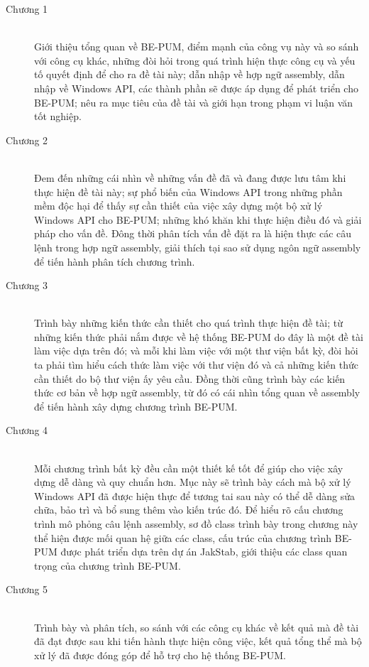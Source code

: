 \begin{description}
  	\item[Chương 1] \hfill \\
	Giới thiệu tổng quan về BE-PUM, điểm mạnh của công vụ này và so sánh với công cụ khác, những đòi hỏi trong quá trình hiện thực công cụ và yếu tố quyết  định để cho ra đề tài này; dẫn nhập về hợp ngữ assembly, dẫn nhập về Windows API, các thành phần sẽ được áp dụng để phát triển cho BE-PUM; nêu ra mục tiêu của đề tài và giới hạn trong phạm vi luận văn tốt nghiệp. \\
 	\item[Chương 2] \hfill \\
	Đem đến những cái nhìn về những vấn đề đã và đang được lưu tâm khi thực hiện đề tài này; sự phổ biến của Windows API trong những phần mềm độc hại để thấy sự cần thiết của việc xây dựng một bộ xử lý Windows API cho BE-PUM; những khó khăn khi thực hiện điều đó và giải pháp cho vấn đề. Đông thời phân tích vấn đề đặt ra là hiện thực các câu lệnh trong hợp ngữ assembly, giải thích tại sao sử dụng ngôn ngữ assembly để tiến hành phân tích chương trình.\\
	\item[Chương 3] \hfill \\
	Trình bày những kiến thức cần thiết cho quá trình thực hiện đề tài; từ những kiến thức phải nắm được về hệ thống BE-PUM do đây là một đề tài làm việc dựa trên đó; và mỗi khi làm việc với một thư viện bất kỳ, đòi hỏi ta phải tìm hiểu cách thức làm việc với thư viện đó và cả những kiến thức cần thiết do bộ thư viện ấy yêu cầu. Đồng thời cũng trình bày các kiến thức cơ bản về hợp ngữ assembly, từ đó có cái nhìn tổng quan về assembly để tiến hành xây dựng chương trình BE-PUM. \\
	\item[Chương 4] \hfill \\
	Mỗi chương trình bất kỳ đều cần một thiết kế tốt để giúp cho việc xây dựng dễ dàng và quy chuẩn hơn. Mục này sẽ trình bày cách mà bộ xử lý Windows API đã được hiện thực để tương tai sau này có thể dễ dàng sửa chữa, bảo trì và bổ sung thêm vào kiến trúc đó. Để hiểu rõ cấu chương trình mô phỏng câu lệnh assembly, sơ đồ class trình bày trong chương này thể hiện được mối quan hệ giữa các class, cấu trúc của chương trình BE-PUM được phát triển dựa trên dự án JakStab, giới thiệu các class quan trọng của chương trình BE-PUM.\\
	\item[Chương 5] \hfill \\
	 Trình bày và phân tích, so sánh với các công cụ khác về kết quả mà đề tài đã đạt được sau khi tiến hành thực hiện công việc, kết quả tổng thể mà bộ xử lý đã được đóng góp để hỗ trợ cho hệ thống BE-PUM.\\

\end{description}

